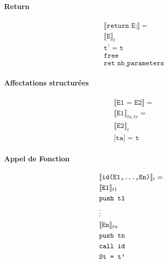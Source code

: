 \documentclass[12pt,twocolumn]{report}
\begin{document}
\begin{trad}
    \paragraph*{Return}
    \begin{align*}
        &\llbracket \texttt{return E;} \rrbracket= \\
        &\llbracket \texttt{E} \rrbracket_{t} \\
        &\texttt{t' = t} \\
        &\texttt{free}\\
        &\texttt{ret nb\_parameters} 
    \end{align*}
\end{trad}
\begin{trad}
    \paragraph*{Affectations structurées}
    \begin{align*}
        &\llbracket \texttt{E1 = E2} \rrbracket= \\
        &\llbracket \texttt{E1} \rrbracket_{ta,tv}= \\
        &\llbracket \texttt{E2} \rrbracket_{t}\\
        &\texttt{[ta] = t} 
    \end{align*}
\end{trad}
\begin{trad}
    \paragraph*{Appel de Fonction}
    \begin{align*}
        &\llbracket \texttt{id(E1,\dots,En)} \rrbracket_t= \\
        &\llbracket \texttt{E1} \rrbracket_{t1} \\
        &\texttt{push t1} \\
        &\vdots\\
        &\llbracket \texttt{En} \rrbracket_{tn}\\
        &\texttt{push tn} \\
        &\texttt{call id}\\
        &\texttt{St = t'}
    \end{align*}
\end{trad}
\end{document}
